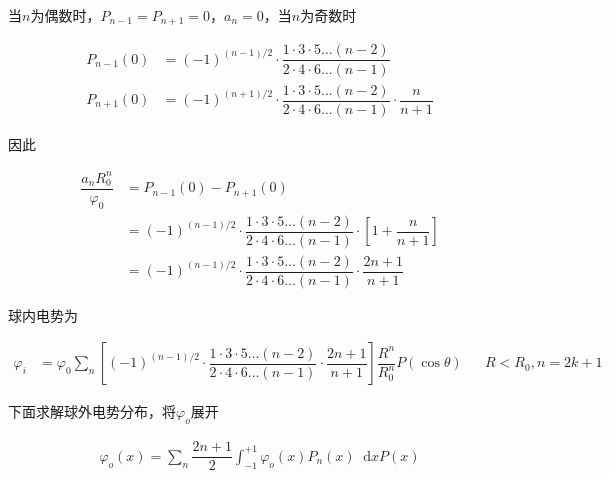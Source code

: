 \documentclass{article}
\newcommand*{\md}{\mathop{}\!\mathrm{d}}
\begin{document}
当$n$为偶数时，$P_{n-1}=P_{n+1}=0$，$a_n=0$，当$n$为奇数时

\begin{equation*}
  \begin{aligned}
    P_{n-1} \left( 0 \right) &= \left( -1  \right)^{\left( n-1 \right)/ 2} \cdot \dfrac{1 \cdot 3 \cdot 5 \dots \left( n-2 \right)}{2 \cdot 4 \cdot 6 \dots \left( n-1 \right)}  \\
    P_{n+1} \left( 0 \right) &= \left( -1  \right)^{\left( n+1 \right)/ 2} \cdot \dfrac{1 \cdot 3 \cdot 5 \dots \left( n-2 \right)}{2 \cdot 4 \cdot 6 \dots \left( n-1 \right)} \cdot \dfrac{n}{n+1}   
  \end{aligned}
\end{equation*}

因此

\begin{equation*}
  \begin{aligned}
    \dfrac{a_n R_0^n }{\varphi_0}  &=
    P_{n-1} \left( 0 \right) - P_{n+1} \left( 0 \right) \\
    &= \left( -1  \right)^{\left( n-1 \right)/ 2} \cdot \dfrac{1 \cdot 3 \cdot 5 \dots \left( n-2 \right)}{2 \cdot 4 \cdot 6 \dots \left( n-1 \right)} \cdot \left[ 1 + \dfrac{n}{n+1}  \right] \\
    &= \left( -1  \right)^{\left( n-1 \right)/ 2} \cdot \dfrac{1 \cdot 3 \cdot 5 \dots \left( n-2 \right)}{2 \cdot 4 \cdot 6 \dots \left( n-1 \right)} \cdot \dfrac{2n+1}{n+1}
  \end{aligned}
\end{equation*}

球内电势为

\begin{equation*}
  \begin{aligned}
    \varphi_i &= \varphi_0 \sum_n \left[ \left( -1  \right)^{\left( n-1 \right)/ 2} \cdot \dfrac{1 \cdot 3 \cdot 5 \dots \left( n-2 \right)}{2 \cdot 4 \cdot 6 \dots \left( n-1 \right)} \cdot \dfrac{2n+1}{n+1}
 \right] \dfrac{R^n}{R_0^n}  P \left( \cos \theta \right) && R<R_0, n=2k+1
  \end{aligned}
\end{equation*}

下面求解球外电势分布，将$\varphi_o$展开

\begin{equation*}
  \begin{aligned}
    \varphi_o \left( x \right) = \sum_n \dfrac{2n+1}{2} \int_{-1}^{+1} \varphi_o \left( x \right) P_n \left( x \right) \md x P \left( x \right) 
  \end{aligned}
\end{equation*}
\end{document}
